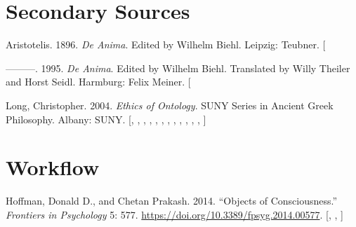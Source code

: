 \documentclass[
  12pt,
  a4paper,
  oneside,
  numbers=noenddot,
  titlepage,
  toclink=all,
  toc=bibliography]{scrbook}
\newlength{\cslhangindent}
\newlength{\cslentryspacingunit} %
\newenvironment{CSLReferences}[2] %
 {%
  \setlength{\parindent}{0pt}
  \ifodd #1
  \let\oldpar\par
  \def\par{\hangindent=\cslhangindent\oldpar}
  \fi
  \setlength{\parskip}{#2\cslentryspacingunit}
 }%
 {}
\theoremstyle{definition}
\theoremstyle{definition}
\theoremstyle{definition}
\theoremstyle{plain}
\theoremstyle{plain}
\theoremstyle{plain}
\theoremstyle{plain}
\theoremstyle{plain}
\theoremstyle{remark}
\begin{document}
\hypertarget{sec-scriv117}{%
\section{Secondary Sources}\label{sec-scriv117}}

\hypertarget{refs_scriv117}{}
\begin{CSLReferences}{1}{0}
\leavevmode{}%
Aristotelis. 1896. \emph{De Anima}. Edited by Wilhelm Biehl. Leipzig:
Teubner. {[}\Acrobatmenu{GoBack}{$\hookleftarrow$}{]}

\leavevmode{}%
---------. 1995. \emph{De Anima}. Edited by Wilhelm Biehl. Translated by
Willy Theiler and Horst Seidl. Harmburg: Felix Meiner.
{[}\Acrobatmenu{GoBack}{$\hookleftarrow$}{]}

\leavevmode{}%
Long, Christopher. 2004. \emph{Ethics of Ontology}. SUNY Series in
Ancient Greek Philosophy. Albany: SUNY.
{[},
\protect\hyperlink{cite_95}{\pageref{cite_95}},
\protect\hyperlink{cite_96}{\pageref{cite_96}},
\protect\hyperlink{cite_97}{\pageref{cite_97}},
\protect\hyperlink{cite_98}{\pageref{cite_98}},
\protect\hyperlink{cite_99}{\pageref{cite_99}},
\protect\hyperlink{cite_100}{\pageref{cite_100}},
\protect\hyperlink{cite_101}{\pageref{cite_101}},
\protect\hyperlink{cite_102}{\pageref{cite_102}},
\protect\hyperlink{cite_103}{\pageref{cite_103}},
\protect\hyperlink{cite_104}{\pageref{cite_104}},
\protect\hyperlink{cite_105}{\pageref{cite_105}},
\protect\hyperlink{cite_106}{\pageref{cite_106}}{]}

\end{CSLReferences}

\hypertarget{sec-scriv163}{%
\section{Workflow}\label{sec-scriv163}}

\hypertarget{refs_scriv163}{}
\begin{CSLReferences}{1}{0}
\leavevmode{}%
Hoffman, Donald D., and Chetan Prakash. 2014. {``Objects of
Consciousness.''} \emph{Frontiers in Psychology} 5: 577.
\url{https://doi.org/10.3389/fpsyg.2014.00577}.
{[},
\protect\hyperlink{cite_105}{\pageref{cite_105}},
\protect\hyperlink{cite_106}{\pageref{cite_106}}{]}

\end{CSLReferences}
\end{document}
